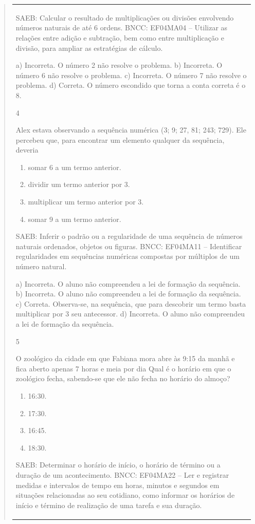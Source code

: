 \begin{mdframed}[linewidth=2pt,linecolor=salmao,roundcorner=2pt]
\begin{itemize}
{\begin{itemize}
\begin{escolha}
{\begin{quote}
{\begin{escolha}
{{{{{\begin{longtable}[]{@{}l@{}}
\begin{itemize}
{SAEB: Calcular o resultado de multiplicações ou divisões
envolvendo números naturais de até 6 ordens.
BNCC: EF04MA04 -- Utilizar as relações entre adição e subtração, bem como entre multiplicação e divisão,
para ampliar as estratégias de cálculo.

a) Incorreta. O número 2 não resolve o problema.
b) Incorreta. O número 6 não resolve o problema.
c) Incorreta. O número 7 não resolve o problema.
d) Correta. O número escondido que torna a conta correta é o 8.

\num{4}

Alex estava observando a sequência numérica (3; 9; 27, 81; 243; 729).
Ele percebeu que, para encontrar um elemento qualquer da sequência,
deveria

\begin{enumerate}
\item
  somar 6 a um termo anterior.
\item
  dividir um termo anterior por 3.
\item
  multiplicar um termo anterior por 3.
\item
  somar 9 a um termo anterior.
\end{enumerate}

SAEB: Inferir o padrão ou a regularidade de uma sequência de
números naturais ordenados, objetos ou figuras.
BNCC: EF04MA11 -- Identificar regularidades em sequências numéricas compostas por múltiplos de um
número natural.

a) Incorreta. O aluno não compreendeu a lei de formação da sequência.
b) Incorreta. O aluno não compreendeu a lei de formação da sequência.
c) Correta. Observa-se, na sequência, que para descobrir um termo basta
multiplicar por 3 seu antecessor.
d) Incorreta. O aluno não compreendeu a lei de formação da sequência.

\num{5}

O zoológico da cidade em que Fabiana mora abre às 9:15 da manhã e fica
aberto apenas 7 horas e meia por dia Qual é o horário em que o zoológico
fecha, sabendo-se que ele não fecha no horário do almoço?

\begin{enumerate}
\item
  16:30.
\item
  17:30.
\item
  16:45.
\item
  18:30.
\end{enumerate}

SAEB: Determinar o horário de início, o horário de término ou
a duração de um acontecimento.
BNCC: EF04MA22 -- Ler e registrar medidas e intervalos de tempo em horas, minutos e segundos em
situações relacionadas ao seu cotidiano, como informar os horários de início e término de realização
de uma tarefa e sua duração.

}
\end{itemize}
\end{longtable}}}}}}
\end{escolha}}
\end{quote}}
\end{escolha}
\end{itemize}}
\end{itemize}
\end{mdframed}
